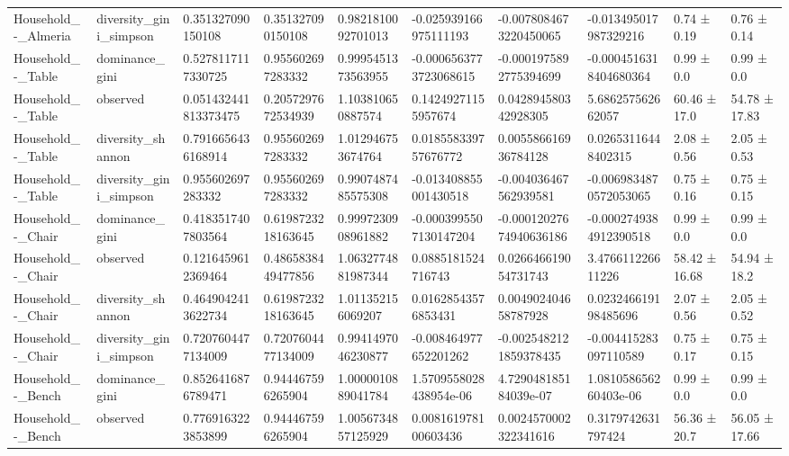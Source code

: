 \begin{longtable}{llllllllll}
Household\_-\_Almeria & diversity\_gini\_simpson & 0.351327090150108 & 0.351327090150108 & 0.9821810092701013 & -0.025939166975111193 & -0.0078084673220450065 & -0.013495017987329216 & 0.74 ± 0.19 & 0.76 ± 0.14 \\
Household\_-\_Table & dominance\_gini & 0.5278117117330725 & 0.955602697283332 & 0.9995451373563955 & -0.0006563773723068615 & -0.0001975892775394699 & -0.0004516318404680364 & 0.99 ± 0.0 & 0.99 ± 0.0 \\
Household\_-\_Table & observed & 0.051432441813373475 & 0.2057297672534939 & 1.103810650887574 & 0.14249271155957674 & 0.042894580342928305 & 5.686257562662057 & 60.46 ± 17.0 & 54.78 ± 17.83 \\
Household\_-\_Table & diversity\_shannon & 0.7916656436168914 & 0.955602697283332 & 1.012946753674764 & 0.018558339757676772 & 0.005586616936784128 & 0.02653116448402315 & 2.08 ± 0.56 & 2.05 ± 0.53 \\
Household\_-\_Table & diversity\_gini\_simpson & 0.955602697283332 & 0.955602697283332 & 0.9907487485575308 & -0.013408855001430518 & -0.004036467562939581 & -0.0069834870572053065 & 0.75 ± 0.16 & 0.75 ± 0.15 \\
Household\_-\_Chair & dominance\_gini & 0.4183517407803564 & 0.6198723218163645 & 0.9997230908961882 & -0.0003995507130147204 & -0.00012027674940636186 & -0.0002749384912390518 & 0.99 ± 0.0 & 0.99 ± 0.0 \\
Household\_-\_Chair & observed & 0.1216459612369464 & 0.4865838449477856 & 1.0632774881987344 & 0.0885181524716743 & 0.026646619054731743 & 3.476611226611226 & 58.42 ± 16.68 & 54.94 ± 18.2 \\
Household\_-\_Chair & diversity\_shannon & 0.4649042413622734 & 0.6198723218163645 & 1.011352156069207 & 0.01628543576853431 & 0.004902404658787928 & 0.023246619198485696 & 2.07 ± 0.56 & 2.05 ± 0.52 \\
Household\_-\_Chair & diversity\_gini\_simpson & 0.7207604477134009 & 0.7207604477134009 & 0.9941497046230877 & -0.008464977652201262 & -0.0025482121859378435 & -0.004415283097110589 & 0.75 ± 0.17 & 0.75 ± 0.15 \\
Household\_-\_Bench & dominance\_gini & 0.8526416876789471 & 0.944467596265904 & 1.0000010889041784 & 1.5709558028438954e-06 & 4.729048185184039e-07 & 1.081058656260403e-06 & 0.99 ± 0.0 & 0.99 ± 0.0 \\
Household\_-\_Bench & observed & 0.7769163223853899 & 0.944467596265904 & 1.0056734857125929 & 0.008161978100603436 & 0.0024570002322341616 & 0.3179742631797424 & 56.36 ± 20.7 & 56.05 ± 17.66 \\

\end{longtable}
